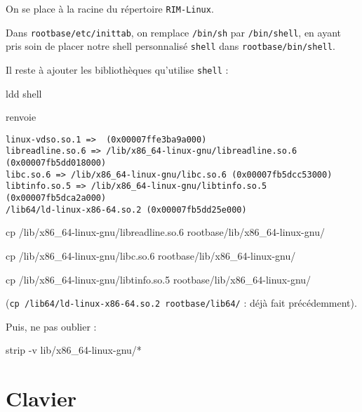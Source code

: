 \documentclass[]{article}
\newenvironment{Shaded}{}{}
\newcommand{\FunctionTok}[1]{\textcolor[rgb]{0.02,0.16,0.49}{{#1}}}
\newcommand{\NormalTok}[1]{{#1}}
\begin{document}
On se place à la racine du répertoire \texttt{RIM-Linux}.

Dans \texttt{rootbase/etc/inittab}, on remplace \texttt{/bin/sh} par
\texttt{/bin/shell}, en ayant pris soin de placer notre shell
personnalisé \texttt{shell} dans \texttt{rootbase/bin/shell}.

Il reste à ajouter les bibliothèques qu'utilise \texttt{shell} :

\begin{Shaded}
\begin{Highlighting}[]
\FunctionTok{ldd} \NormalTok{shell}
\end{Highlighting}
\end{Shaded}

renvoie

\begin{verbatim}
linux-vdso.so.1 =>  (0x00007ffe3ba9a000)
libreadline.so.6 => /lib/x86_64-linux-gnu/libreadline.so.6 (0x00007fb5dd018000)
libc.so.6 => /lib/x86_64-linux-gnu/libc.so.6 (0x00007fb5dcc53000)
libtinfo.so.5 => /lib/x86_64-linux-gnu/libtinfo.so.5 (0x00007fb5dca2a000)
/lib64/ld-linux-x86-64.so.2 (0x00007fb5dd25e000)
\end{verbatim}

\begin{Shaded}
\begin{Highlighting}[]
\FunctionTok{cp} \NormalTok{/lib/x86_64-linux-gnu/libreadline.so.6 rootbase/lib/x86_64-linux-gnu/}

\FunctionTok{cp} \NormalTok{/lib/x86_64-linux-gnu/libc.so.6 rootbase/lib/x86_64-linux-gnu/}

\FunctionTok{cp} \NormalTok{/lib/x86_64-linux-gnu/libtinfo.so.5 rootbase/lib/x86_64-linux-gnu/}
\end{Highlighting}
\end{Shaded}

(\texttt{cp\ /lib64/ld-linux-x86-64.so.2\ rootbase/lib64/} : déjà fait
précédemment).

Puis, ne pas oublier :

\begin{Shaded}
\begin{Highlighting}[]
\FunctionTok{strip} \NormalTok{-v lib/x86_64-linux-gnu/*}
\end{Highlighting}
\end{Shaded}

\section{Clavier}\label{clavier}
\end{document}
